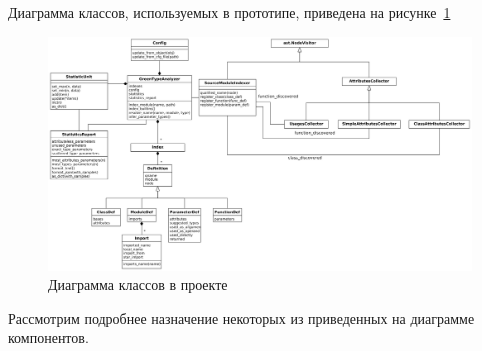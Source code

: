 Диаграмма классов, используемых в прототипе, приведена на
рисунке~\ref{fig:classes-diag}

\begin{figure}
\begin{center}
  \includegraphics[width=\textwidth]{fig/classes-diag.png}
\end{center}
\caption{Диаграмма классов в проекте}
\label{fig:classes-diag}
\end{figure}

Рассмотрим подробнее назначение некоторых из приведенных на диаграмме компонентов.

